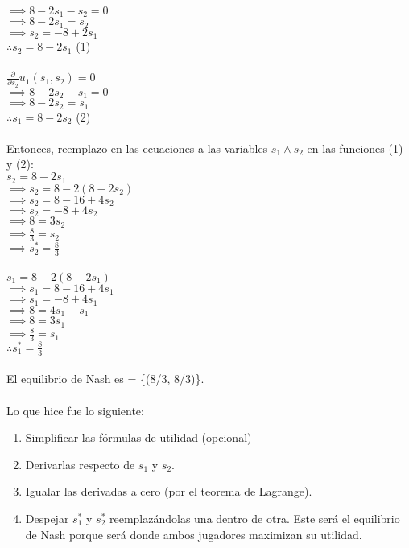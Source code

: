\documentclass{article}
\begin{document}
            \(\implies 8 -2s_{1} - s_{2} = 0\) \\
            \(\implies 8 -2s_{1} = s_{2}\) \\
            \(\implies s_{2} = -8+2s_{1}\) \\
            \(\therefore s_{2} = 8-2s_{1}\) (1) \\
            \\
            \(\frac{\partial}{\partial s_{2}}u_{1}(s_{1}, s_{2}) = 0\) \\
            \(\implies 8 - 2s_{2} - s_{1} = 0\) \\
            \(\implies 8 - 2s_{2} = s_{1}\) \\
            \(\therefore s_{1} = 8 - 2s_{2}\) (2)\\
            \\
            Entonces, reemplazo en las ecuaciones a las variables \(s_{1} \wedge s_{2}\) en las funciones (1) y (2): \\
            \(s_{2} = 8-2s_{1}\) \\
            \(\implies s_{2} = 8-2(8-2s_{2})\) \\
            \(\implies s_{2} = 8-16+4s_{2}\) \\
            \(\implies s_{2} = -8+4s_{2}\) \\
            \(\implies 8 = 3s_{2}\) \\
            \(\implies \frac{8}{3} = s_{2}\) \\
            \(\implies s_{2}^{*} = \frac{8}{3}\) \\
            \\
            \(s_{1} = 8 - 2(8-2s_{1})\)\\
            \(\implies s_{1} = 8-16+4s_{1}\)\\
            \(\implies s_{1} = -8+4s_{1}\)\\
            \(\implies 8 = 4s_{1}-s_{1}\)\\
            \(\implies 8 = 3s_{1}\)\\
            \(\implies \frac{8}{3} = s_{1}\)\\
            \(\therefore s_{1}^{*} = \frac{8}{3}\)\\
            \\
            El equilibrio de Nash es = \{(8/3, 8/3)\}. \\
            \\
            Lo que hice fue lo siguiente:
            \begin{enumerate}
                \item Simplificar las fórmulas de utilidad (opcional)
                \item Derivarlas respecto de $s_{1}$ y $s_{2}$.
                \item Igualar las derivadas a cero (por el teorema de Lagrange).
                \item Despejar $s_{1}^{*}$ y $s_{2}^{*}$ reemplazándolas una dentro de otra.
                    \subitem Este será el equilibrio de Nash porque será donde ambos jugadores maximizan su utilidad.
            \end{enumerate}
\end{document}
